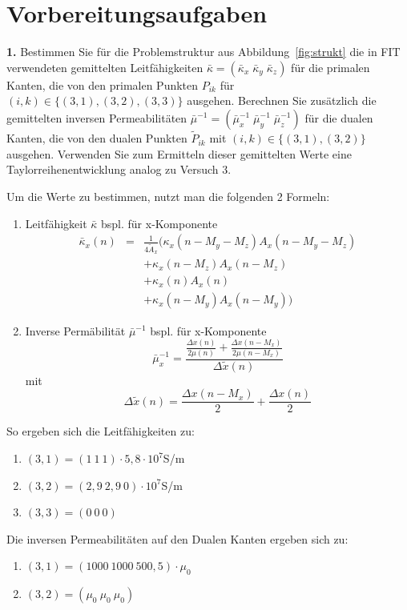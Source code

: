 \documentclass[Protokollheft.tex]{subfiles}
\begin{document}
\section{Vorbereitungsaufgaben}

\begin{framed}
	\noindent \textbf{1.} Bestimmen Sie für die Problemstruktur aus Abbildung~\ref{fig:strukt} die in FIT verwendeten
    gemittelten Leitfähigkeiten $\bar{\kappa}=(\bar{\kappa}_x\;\bar{\kappa}_y\;\bar{\kappa}_z)$ für die primalen Kanten, die von den primalen Punkten $P_{ik}$ für $(i,k)\in\{(3,1),(3,2),(3,3)\}$ ausgehen. Berechnen Sie zusätzlich die gemittelten inversen Permeabilitäten $\bar{\mu}^{-1}=(\bar{\mu}_x^{-1}\;\bar{\mu}_y^{-1}\;\bar{\mu}_z^{-1})$ für die dualen Kanten, die von den dualen Punkten $\widetilde{P}_{ik}$ mit $(i,k)\in\{(3,1),(3,2)\}$ ausgehen. Verwenden Sie zum Ermitteln dieser gemittelten Werte eine Taylorreihenentwicklung analog zu Versuch 3.\label{exer:averagedMaterials}
\end{framed}

Um die Werte zu bestimmen, nutzt man die folgenden 2 Formeln:
\begin{enumerate}
	\item Leitfähigkeit $\bar{\kappa}$
     bspl. für x-Komponente
     \begin{eqnarray*} \bar{\kappa}_x(n)& = &\frac{1}{4\tilde{A}_x}(\kappa_x(n-M_y-M_z)A_x(n-M_y-M_z)\\
     &  &+\kappa_x(n-M_z)A_x(n-M_z)\\
     &    &+\kappa_x(n)A_x(n)\\
     &   &+\kappa_x(n-M_y)A_x(n-M_y))
    \end{eqnarray*}

 \item Inverse Permäbilität $\bar{\mu}^{-1}$ bspl. für x-Komponente
$$\bar{\mu}_x^{-1}=\frac{\frac{\Delta x(n)}{2\mu(n)}+\frac{\Delta x(n-M_x)}{2\mu(n-M_x)}}{\Delta\tilde{x}(n)}$$ mit $$ \Delta\tilde{x}(n)=\frac{\Delta x(n-M_x)}{2}+\frac{\Delta x(n)}{2}$$
\end{enumerate}

So ergeben sich die Leitfähigkeiten zu:
\begin{enumerate}
	\item $(3,1) = (1\ 1\ 1) \cdot 5,8\cdot 10^7$S/m
	\item $(3,2) = (2,9\ 2,9\ 0)\cdot 10^7$S/m
	\item $(3,3) = (0\ 0\ 0)$
\end{enumerate}
Die inversen Permeabilitäten auf den Dualen Kanten ergeben sich zu:
\begin{enumerate}
	\item $(3,1) = (1000\ 1000\ 500,5)\cdot \mu_0$
	\item $(3,2) = (\mu_0\ \mu_0\ \mu_0)$
\end{enumerate}
\end{document}
